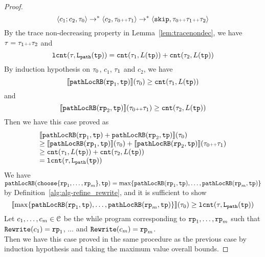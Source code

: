 \begin{proof}
\[
  \langle c_1; c_2, \mathtt{\tau}_0 \rangle \to^* \langle c_2, \mathtt{\tau}_0 {\scriptscriptstyle ++} \mathtt{\tau}_1 \rangle \to^* \langle \mathtt{skip}, \mathtt{\tau}_0 {\scriptscriptstyle ++} \mathtt{\tau}_1 {\scriptscriptstyle ++} \mathtt{\tau}_2 \rangle
\]
By the trace non-decreasing property in Lemma~\ref{lem:tracenondec}, we have $\mathtt{\tau} = \mathtt{\tau}_1 {\scriptscriptstyle ++} \mathtt{\tau}_2$ and 
\[
  \mathtt{lcnt}(\mathtt{\tau}, \mathtt{L}_{\mathtt{path}}(\mathtt{tp}))  = \mathtt{cnt}(\mathtt{\tau}_1, L(\mathtt{tp}))  + \mathtt{cnt}(\mathtt{\tau}_2, L(\mathtt{tp})) 
\]
By induction hypothesis on $\mathtt{\tau}_0$, $c_1$, $\mathtt{\tau}_1$ and $c_2$, we have
\[
  \llbracket \mathtt{pathLocRB}(\mathtt{rp}_1, \mathtt{tp}) \rrbracket(\mathtt{\tau}_0) \geq \mathtt{cnt}(\mathtt{\tau}_1, L(\mathtt{tp})) 
\]
 and 
  \[
    \llbracket \mathtt{pathLocRB}(\mathtt{rp}_2, \mathtt{tp}) \rrbracket(\mathtt{\tau}_0 {\scriptscriptstyle ++} \mathtt{\tau}_1) \geq \mathtt{cnt}(\mathtt{\tau}_2, L(\mathtt{tp})) 
  \]
Then we have this case proved as
\[
  \begin{array}{l}
  \llbracket \mathtt{pathLocRB}(\mathtt{rp}_1, \mathtt{tp}) + \mathtt{pathLocRB}(\mathtt{rp}_2, \mathtt{tp}) \rrbracket(\mathtt{\tau}_0)
  \\
  \geq \llbracket \mathtt{pathLocRB}(\mathtt{rp}_1, \mathtt{tp}) \rrbracket(\mathtt{\tau}_0) + \llbracket \mathtt{pathLocRB}(\mathtt{rp}_2, \mathtt{tp}) \rrbracket(\mathtt{\tau}_0 {\scriptscriptstyle ++} \mathtt{\tau}_1)
  \\
  \geq \mathtt{cnt}(\mathtt{\tau}_1, L(\mathtt{tp}))  + \mathtt{cnt}(\mathtt{\tau}_2, L(\mathtt{tp})) 
  \\
  = \mathtt{lcnt}(\mathtt{\tau}, \mathtt{L}_{\mathtt{path}}(\mathtt{tp}))
  \end{array}
  \] 
We have $\outinB(\rpchoose{\rprog_1, \ldots, \rprog_m }, \tpath) = \max\left\{ \outinB(\rprog_1, \tpath), \ldots, \outinB(\rprog_m, \tpath) \right\}$ by Definition~\ref{alg:alg-refine_rewrite}, and
it is sufficient to show
\[
  \econfig{\max\left\{ \outinB(\rprog_1, \tpath), \ldots, \outinB(\rprog_m, \tpath) \right\}}(\trace_0) \geq \lcounter(\trace, \pathl(\tpath)) 
\]
Let $c_1, \ldots, c_m \in \mathcal{C}$ be the while program corresponding to $\mathtt{rp}_1, \ldots, \mathtt{rp}_m$ such that $\mathtt{Rewrite}(c_1) = \mathtt{rp}_1$, $\ldots$ and  $\mathtt{Rewrite}(c_m) = \mathtt{rp}_m$.
\\
Then we have this case proved in the same procedure as the previous case by induction hypothesis and taking the maximum value overall bounds.
\end{proof}
